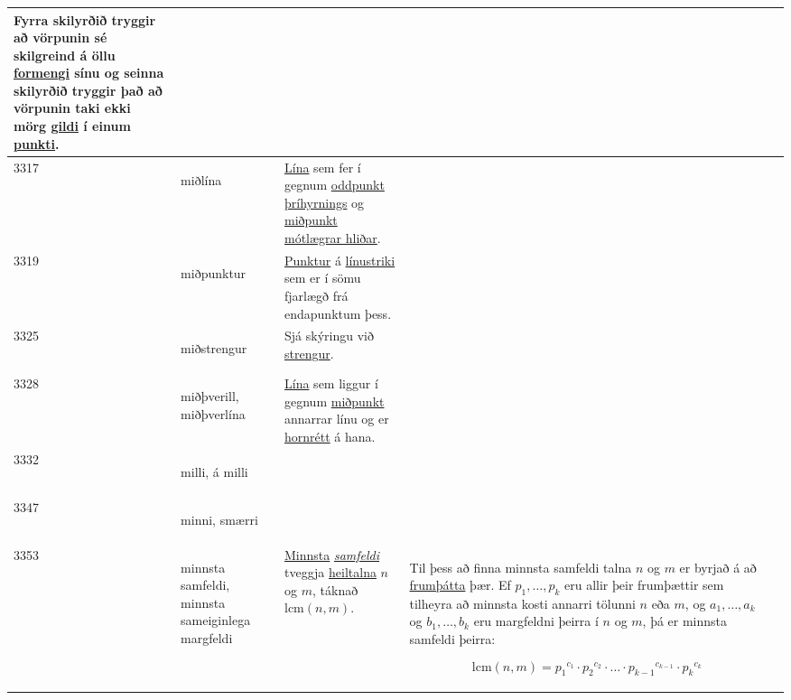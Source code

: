 \begin{longtable}{p{} | p{} | p{} | p{} | p{}}
Fyrra skilyrðið tryggir að vörpunin sé skilgreind á öllu \hyperlink{row:1343}{formengi} sínu og seinna skilyrðið tryggir það að vörpunin taki ekki mörg \hyperlink{row:5968}{gildi} í einum \hyperlink{row:4001}{punkti}. &  \\
\hline
3317 & \hypertarget{row:3317}{miðlína} & \hyperlink{row:2911}{Lína} sem fer í gegnum \hyperlink{row:3661}{oddpunkt} \hyperlink{row:6438}{þríhyrnings} og \hyperlink{row:3319}{miðpunkt} \hyperlink{row:3396}{mótlægrar hliðar}. &  &  \\
\hline
3319 & \hypertarget{row:3319}{miðpunktur} & \hyperlink{row:4001}{Punktur} á \hyperlink{row:2958}{línustriki} sem er í sömu fjarlægð frá endapunktum þess. &  &  \\
\hline
3325 & \hypertarget{row:3325}{miðstrengur} & Sjá skýringu við \hyperlink{row:5261}{strengur}. &  &  \\
\hline
3328 & \hypertarget{row:3328}{miðþverill, miðþverlína} & \hyperlink{row:2911}{Lína} sem liggur í gegnum \hyperlink{row:3319}{miðpunkt} annarrar línu og er \hyperlink{row:6469}{hornrétt} á hana. &  &  \\
\hline
3332 & \hypertarget{row:3332}{milli, á milli} &  &  &  \\
\hline
3347 & \hypertarget{row:3347}{minni, smærri} &  &  &  \\
\hline
3353 & \hypertarget{row:3353}{minnsta samfeldi, minnsta sameiginlega margfeldi} & \hyperlink{row:3347}{Minnsta} \hyperlink{row:4343}{\textit{samfeldi}} tveggja \hyperlink{row:1896}{heiltalna} \(n\) og \(m\), táknað \(\text{lcm}(n,m)\). & Til þess að finna minnsta samfeldi talna \(n\) og \(m\) er byrjað á að \hyperlink{row:5824}{frumþátta} þær. Ef \(p_{1},\ldots,p_{k}\) eru allir þeir frumþættir sem tilheyra að minnsta kosti annarri tölunni \(n\) eða \(m\), og \(a_{1},\ldots,a_{k}\) og \(b_{1},\ldots,b_{k}\) eru margfeldni þeirra í \(n\) og \(m\), þá er minnsta samfeldi þeirra:

\[ \text{lcm}(n,m) = {p_{1}}^{c_{1}} \cdot {p_{2}}^{c_{2}} \cdot \ldots \cdot {p_{k-1}}^{c_{k-1}} \cdot {p_{k}}^{c_{k}} \] 


\end{longtable}
